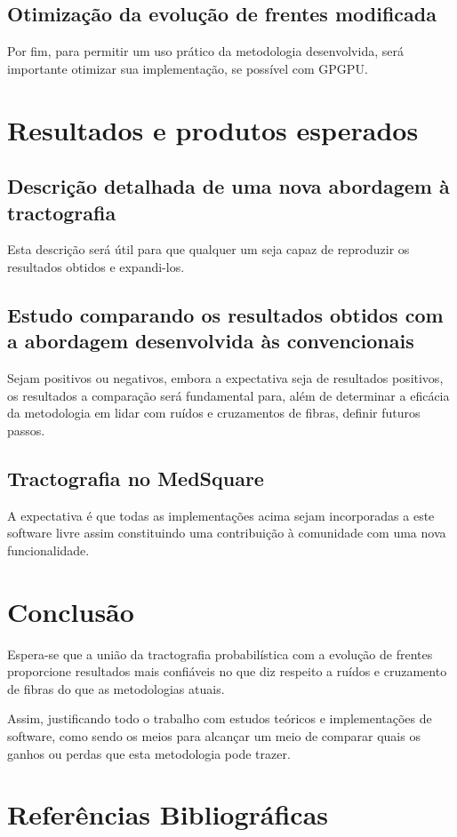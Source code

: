 \documentclass[a4paper,11pt]{report}
\begin{document}
  \section{Otimização da evolução de frentes modificada}
  Por fim, para permitir um uso prático da metodologia desenvolvida, será importante otimizar sua implementação, se possível com GPGPU.

\chapter{Resultados e produtos esperados}
  \section{Descrição detalhada de uma nova abordagem à tractografia}
  Esta descrição será útil para que qualquer um seja capaz de reproduzir os resultados obtidos e expandi-los.
  
  \section{Estudo comparando os resultados obtidos com a abordagem desenvolvida às convencionais}
  Sejam positivos ou negativos, embora a expectativa seja de resultados positivos, os resultados a comparação será fundamental para, além de determinar a eficácia da metodologia em lidar com ruídos e cruzamentos de fibras, definir futuros passos.

  \section{Tractografia no MedSquare}
  A expectativa é que todas as implementações acima sejam incorporadas a este software livre assim constituindo uma contribuição à comunidade com uma nova funcionalidade.

\chapter{Conclusão}
Espera-se que a união da tractografia probabilística com a evolução de frentes proporcione resultados mais confiáveis no que diz respeito a ruídos e cruzamento de fibras do que as metodologias atuais.

Assim, justificando todo o trabalho com estudos teóricos e implementações de software, como sendo os meios para alcançar um meio de comparar quais os ganhos ou perdas que esta metodologia pode trazer.

\chapter{Referências Bibliográficas} \label{ch: biblio}
\end{document}
